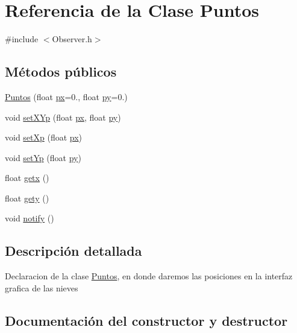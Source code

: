 \hypertarget{class_puntos}{}\section{Referencia de la Clase Puntos}
\label{class_puntos}


{\ttfamily \#include $<$Observer.\+h$>$}

\subsection*{Métodos públicos}
\begin{DoxyCompactItemize}
\item 
\mbox{\hyperlink{class_puntos_a57988fb0d4d298eb86557be23de9b656}{Puntos}} (float \mbox{\hyperlink{_abstract_8cpp_a78b43084be0dc0d22055a701994a2a9e}{px}}=0., float \mbox{\hyperlink{_abstract_8cpp_a709aad4619f93afb87fab238013812b2}{py}}=0.)
\item 
void \mbox{\hyperlink{class_puntos_af2adca108176e9ee64237ad1c4b85f78}{set\+X\+Yp}} (float \mbox{\hyperlink{_abstract_8cpp_a78b43084be0dc0d22055a701994a2a9e}{px}}, float \mbox{\hyperlink{_abstract_8cpp_a709aad4619f93afb87fab238013812b2}{py}})
\item 
void \mbox{\hyperlink{class_puntos_a500e4016c0aa68362c2dc1161e1b2a27}{set\+Xp}} (float \mbox{\hyperlink{_abstract_8cpp_a78b43084be0dc0d22055a701994a2a9e}{px}})
\item 
void \mbox{\hyperlink{class_puntos_a657ead3e6df8a67babe339b3c3d63588}{set\+Yp}} (float \mbox{\hyperlink{_abstract_8cpp_a709aad4619f93afb87fab238013812b2}{py}})
\item 
float \mbox{\hyperlink{class_puntos_a28373f6fd5024a32aedee640c39f23e9}{getx}} ()
\item 
float \mbox{\hyperlink{class_puntos_a2a51db64fb37a5785705742ffe4e4c39}{gety}} ()
\item 
void \mbox{\hyperlink{class_puntos_a932a43997f32e52b8bfdc0fe17f92931}{notify}} ()
\end{DoxyCompactItemize}


\subsection{Descripción detallada}
Declaracion de la clase \mbox{\hyperlink{class_puntos}{Puntos}}, en donde daremos las posiciones en la interfaz grafica de las nieves 

\subsection{Documentación del constructor y destructor}
\mbox{\label{class_puntos_a57988fb0d4d298eb86557be23de9b656}} 
